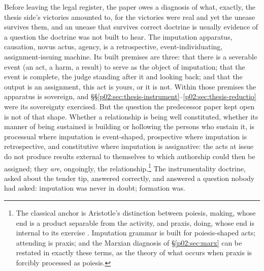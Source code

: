 Before leaving the legal register, the paper owes a diagnosis of what, exactly, the thesis side's victories amounted to, for the victories were real and yet the unease survives them, and an unease that survives correct doctrine is usually evidence of a question the doctrine was not built to hear. The imputation apparatus, causation, novus actus, agency, is a retrospective, event-individuating, assignment-issuing machine. Its built premises are three: that there is a severable event (an act, a harm, a result) to serve as the object of imputation; that the event is complete, the judge standing after it and looking back; and that the output is an assignment, this act is yours, or it is not. Within those premises the apparatus is sovereign, and \S\S\ref{p02:sec:thesis-instrument}--\ref{p02:sec:thesis-reductio} were its sovereignty exercised. But the question the predecessor paper kept open is not of that shape. Whether a relationship is being well constituted, whether its manner of being sustained is building or hollowing the persons who sustain it, is processual where imputation is event-shaped, prospective where imputation is retrospective, and constitutive where imputation is assignative: the acts at issue do not produce results external to themselves to which authorship could then be assigned; they \emph{are}, ongoingly, the relationship.\footnote{The classical anchor is Aristotle's distinction between poiesis, making, whose end is a product separable from the activity, and praxis, doing, whose end is internal to its exercise \parencite[VI.4--5]{aristotle2009nicomachean}. Imputation grammar is built for poiesis-shaped acts; attending is praxis; and the Marxian diagnosis of \S\ref{p02:sec:marx} can be restated in exactly these terms, as the theory of what occurs when praxis is forcibly processed as poiesis.} The instrumentality doctrine, asked about the tender tip, answered correctly, and answered a question nobody had asked: imputation was never in doubt; formation was.

